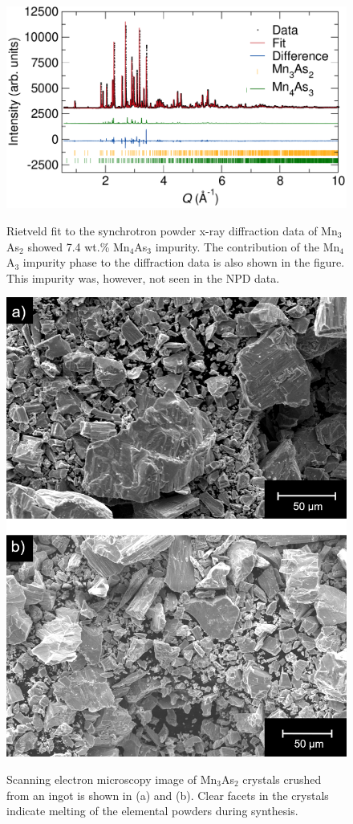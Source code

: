 \documentclass[letterpaper,10pt,doublespacing,edeposit]{uiucthesis2020}
\begin{document}
\begin{mainmatter}
\begin{figure}[h]
\centering\includegraphics[width=0.7\columnwidth]{figures/ch6/6121_Mn3As2_cropped.pdf} \\
\caption{\label{fig:11BM_data}
Rietveld fit to the synchrotron powder x-ray diffraction data of Mn$_3$As$_2$ showed 7.4 wt.\% Mn$_4$As$_3$ impurity. The contribution of the Mn$_4$A$_3$ impurity phase to the diffraction data is also shown in the figure. This impurity was, however, not seen in the NPD data.
} 
\end{figure}

\begin{figure}
\centering\includegraphics[width=0.7\columnwidth]{figures/ch6/Mn3As2_SEM_image.png} \\
\caption{\label{fig:SEM_image}
Scanning electron microscopy image of Mn$_3$As$_2$ crystals crushed from an ingot is shown in (a) and (b). Clear facets in the crystals indicate melting of the elemental powders during synthesis. 
} 
\end{figure}


\end{mainmatter}
\end{document}
